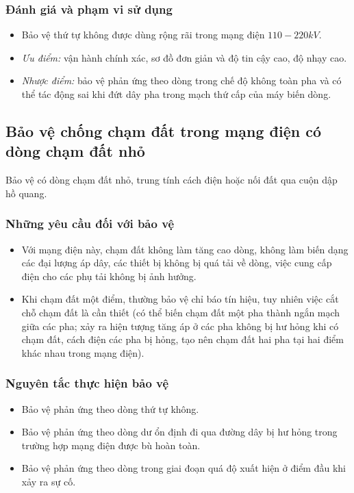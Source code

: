 \documentclass[12pt,a4paper]{article}
\begin{document}

\subsubsection{Đánh giá và phạm vi sử dụng}
	\begin{itemize}
		\item Bảo vệ thứ tự không được dùng rộng rãi trong mạng điện $110 - 220 \unit{kV}$.
		
		\item \emph{Ưu điểm:} vận hành chính xác, sơ đồ đơn giản và độ tin cậy cao, độ nhạy cao.
		
		\item \emph{Nhược điểm:} bảo vệ phản ứng theo dòng trong chế độ không toàn pha và có thể tác động sai khi đứt dây pha trong mạch thứ cấp của máy biến dòng.
	\end{itemize}
\subsection{Bảo vệ chống chạm đất trong mạng điện có dòng chạm đất nhỏ}
	Bảo vệ có dòng chạm đất nhỏ, trung tính cách điện hoặc nối đất qua cuộn dập hồ quang.
\subsubsection{Những yêu cầu đối với bảo vệ}
	\begin{itemize}
		\item Với mạng điện này, chạm đất không làm tăng cao dòng, không làm biến dạng các đại lượng áp dây, các thiết bị không bị quá tải về dòng, việc cung cấp điện cho các phụ tải không bị ảnh hưởng.
		
		\item Khi chạm đất một điểm, thường bảo vệ chỉ báo tín hiệu, tuy nhiên việc cắt chỗ chạm đất là cần thiết (có thể biến chạm đất một pha thành ngắn mạch giữa các pha; xảy ra hiện tượng tăng áp ở các pha không bị hư hỏng khi có chạm đất, cách điện các pha bị hỏng, tạo nên chạm đất hai pha tại hai điểm khác nhau trong mạng điện).
	\end{itemize}
\subsubsection{Nguyên tắc thực hiện bảo vệ}
	\begin{itemize}
		\item Bảo vệ phản ứng theo dòng thứ tự không.
		
		\item Bảo vệ phản ứng theo dòng dư ổn định đi qua đường dây bị hư hỏng trong trường hợp mạng điện được bù hoàn toàn.
		
		\item Bảo vệ phản ứng theo dòng trong giai đoạn quá độ xuất hiện ở điểm đầu khi xảy ra sự cố.
	\end{itemize}
\end{document}
